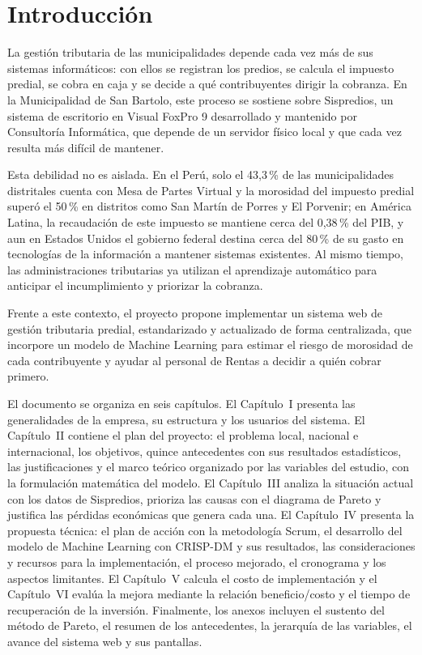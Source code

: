 \documentclass[12pt,a4paper]{report}
\newcounter{anexo}
\begin{document}
\chapter*{Introducción}

La gestión tributaria de las municipalidades depende cada vez más de sus sistemas informáticos: con ellos se registran los predios, se calcula el impuesto predial, se cobra en caja y se decide a qué contribuyentes dirigir la cobranza. En la Municipalidad de San Bartolo, este proceso se sostiene sobre Sispredios, un sistema de escritorio en Visual FoxPro 9 desarrollado y mantenido por Consultoría Informática, que depende de un servidor físico local y que cada vez resulta más difícil de mantener.

Esta debilidad no es aislada. En el Perú, solo el 43,3\,\% de las municipalidades distritales cuenta con Mesa de Partes Virtual y la morosidad del impuesto predial superó el 50\,\% en distritos como San Martín de Porres y El Porvenir; en América Latina, la recaudación de este impuesto se mantiene cerca del 0,38\,\% del PIB, y aun en Estados Unidos el gobierno federal destina cerca del 80\,\% de su gasto en tecnologías de la información a mantener sistemas existentes. Al mismo tiempo, las administraciones tributarias ya utilizan el aprendizaje automático para anticipar el incumplimiento y priorizar la cobranza.

Frente a este contexto, el proyecto propone implementar un sistema web de gestión tributaria predial, estandarizado y actualizado de forma centralizada, que incorpore un modelo de Machine Learning para estimar el riesgo de morosidad de cada contribuyente y ayudar al personal de Rentas a decidir a quién cobrar primero.

El documento se organiza en seis capítulos. El Capítulo~I presenta las generalidades de la empresa, su estructura y los usuarios del sistema. El Capítulo~II contiene el plan del proyecto: el problema local, nacional e internacional, los objetivos, quince antecedentes con sus resultados estadísticos, las justificaciones y el marco teórico organizado por las variables del estudio, con la formulación matemática del modelo. El Capítulo~III analiza la situación actual con los datos de Sispredios, prioriza las causas con el diagrama de Pareto y justifica las pérdidas económicas que genera cada una. El Capítulo~IV presenta la propuesta técnica: el plan de acción con la metodología Scrum, el desarrollo del modelo de Machine Learning con CRISP-DM y sus resultados, las consideraciones y recursos para la implementación, el proceso mejorado, el cronograma y los aspectos limitantes. El Capítulo~V calcula el costo de implementación y el Capítulo~VI evalúa la mejora mediante la relación beneficio/costo y el tiempo de recuperación de la inversión. Finalmente, los anexos incluyen el sustento del método de Pareto, el resumen de los antecedentes, la jerarquía de las variables, el avance del sistema web y sus pantallas.
\end{document}
